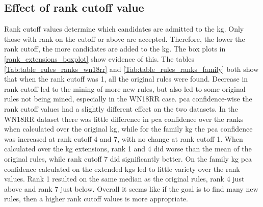 \fi




\newpage
\subsection{Effect of rank cutoff value}
Rank cutoff values determine which candidates are admitted to the \gls{kg}. Only those with rank on the cutoff or above are accepted. Therefore, the lower the rank cutoff, the more candidates are added to the \gls{kg}. The box plots in \cref{rank_extensions_boxplot} show evidence of this. The tables \ref{Tab:table_rules_ranks_wn18rr} and \ref{Tab:table_rules_ranks_family} both show that when the rank cutoff was 1, all the original rules were found. Decrease in rank cutoff led to the mining of more new rules, but  also led to some original rules not being mined, especially in the WN18RR case. \gls{pca} confidence-wise the rank cutoff values had a slightly different effect on the two datasets. In the WN18RR dataset there was little difference in \gls{pca} confidence over the ranks when calculated over the original \gls{kg}, while for the family \gls{kg} the \gls{pca} confidence was increased at rank cutoff 4 and 7, with no change at rank cutoff 1. When calculated over the \gls{kg} extensions, rank 1 and 4 did worse than the mean of the original rules, while rank cutoff 7 did significantly better. On the family \gls{kg} \gls{pca} confidence calculated on the extended \glspl{kg} led to little variety over the rank values. Rank 1 resulted on the same median as the original rules, rank 4 just above and rank 7 just below. Overall it seems like if the goal is to find many new rules, then a higher rank cutoff values is more appropriate.

